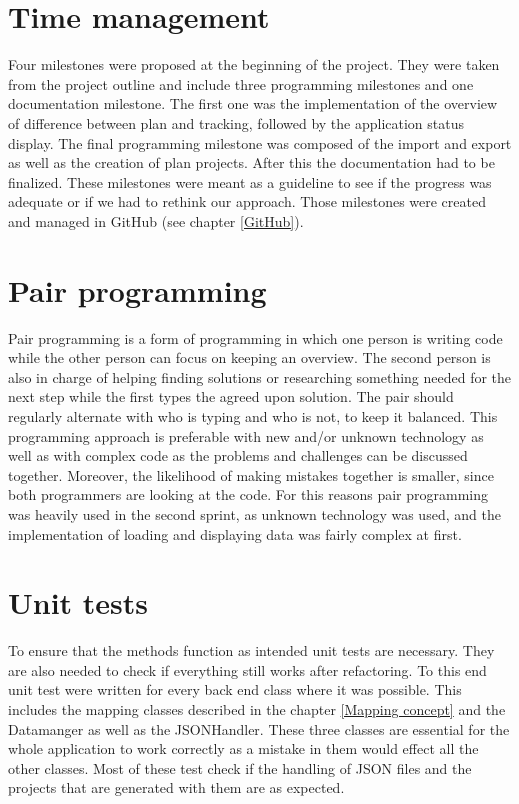 \section{Time management} \label{Time management}
Four milestones were proposed at the beginning of the project. They were taken from the project outline and include three programming milestones and one documentation milestone. The first one was the implementation of the overview of difference between plan and tracking, followed by the application status display. The final programming milestone was composed of the import and export as well as the creation of plan projects. After this the documentation had to be finalized. These milestones were meant as a guideline to see if the progress was adequate or if we had to rethink our approach. Those milestones were created and managed in GitHub (see chapter \ref{GitHub}). 

\section{Pair programming}
Pair programming \cite{pairprogramming-url} is a form of programming in which one person is writing code while the other person can focus on keeping an overview. The second person is also in charge of helping finding solutions or researching something needed for the next step while the first types the agreed upon solution. The pair should regularly alternate with who is typing and who is not, to keep it balanced. This programming approach is preferable with new and/or unknown technology as well as with complex code as the problems and challenges can be discussed together. Moreover, the likelihood of making mistakes together is smaller, since both programmers are looking at the code. For this reasons pair programming was heavily used in the second sprint, as unknown technology was used, and the implementation of loading and displaying data was fairly complex at first. 

\section{Unit tests}
To ensure that the methods function as intended unit tests are necessary. They are also needed to check if everything still works after refactoring. To this end unit test were written for every back end class where it was possible. This includes the mapping classes described in the chapter \ref{Mapping concept} and the Datamanger as well as the JSONHandler. These three classes are essential for the whole application to work correctly as a mistake in them would effect all the other classes. Most of these test check if the handling of JSON files and the projects that are generated with them are as expected.